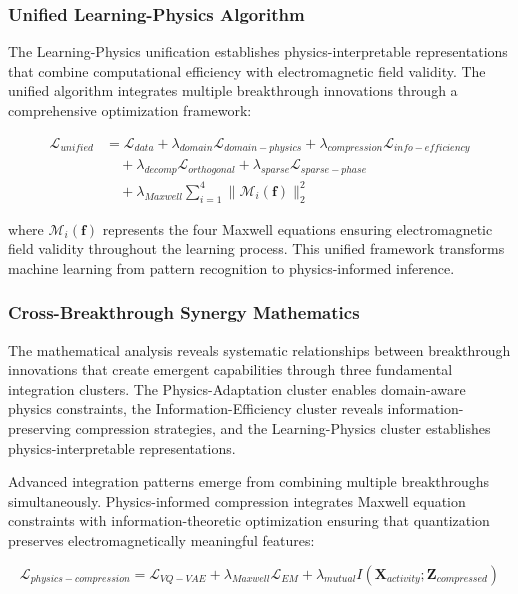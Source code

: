\documentclass[journal]{IEEEtran}
\begin{document}
\subsubsection{Unified Learning-Physics Algorithm}

The Learning-Physics unification establishes physics-interpretable representations that combine computational efficiency with electromagnetic field validity. The unified algorithm integrates multiple breakthrough innovations through a comprehensive optimization framework:

\begin{align}
\mathcal{L}_{unified} &= \mathcal{L}_{data} + \lambda_{domain} \mathcal{L}_{domain-physics} + \lambda_{compression} \mathcal{L}_{info-efficiency} \nonumber \\
&\quad + \lambda_{decomp} \mathcal{L}_{orthogonal} + \lambda_{sparse} \mathcal{L}_{sparse-phase} \nonumber \\
&\quad + \lambda_{Maxwell} \sum_{i=1}^{4} \|\mathcal{M}_i(\mathbf{f})\|_2^2 \label{eq:unified_framework}
\end{align}

where $\mathcal{M}_i(\mathbf{f})$ represents the four Maxwell equations ensuring electromagnetic field validity throughout the learning process. This unified framework transforms machine learning from pattern recognition to physics-informed inference.

\subsubsection{Cross-Breakthrough Synergy Mathematics}

The mathematical analysis reveals systematic relationships between breakthrough innovations that create emergent capabilities through three fundamental integration clusters. The Physics-Adaptation cluster enables domain-aware physics constraints, the Information-Efficiency cluster reveals information-preserving compression strategies, and the Learning-Physics cluster establishes physics-interpretable representations.

Advanced integration patterns emerge from combining multiple breakthroughs simultaneously. Physics-informed compression integrates Maxwell equation constraints with information-theoretic optimization ensuring that quantization preserves electromagnetically meaningful features:

\begin{equation}
\mathcal{L}_{physics-compression} = \mathcal{L}_{VQ-VAE} + \lambda_{Maxwell} \mathcal{L}_{EM} + \lambda_{mutual} I(\mathbf{X}_{activity}; \mathbf{Z}_{compressed})
\label{eq:physics_compression}
\end{equation}
\end{document}

